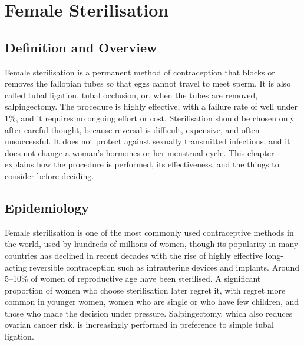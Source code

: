 \chapter{Female Sterilisation}

\section*{Definition and Overview}
Female sterilisation is a permanent method of contraception that blocks or removes the fallopian tubes so that eggs cannot travel to meet sperm. It is also called tubal ligation, tubal occlusion, or, when the tubes are removed, salpingectomy. The procedure is highly effective, with a failure rate of well under 1\%, and it requires no ongoing effort or cost. Sterilisation should be chosen only after careful thought, because reversal is difficult, expensive, and often unsuccessful. It does not protect against sexually transmitted infections, and it does not change a woman's hormones or her menstrual cycle. This chapter explains how the procedure is performed, its effectiveness, and the things to consider before deciding.

\section*{Epidemiology}
Female sterilisation is one of the most commonly used contraceptive methods in the world, used by hundreds of millions of women, though its popularity in many countries has declined in recent decades with the rise of highly effective long-acting reversible contraception such as intrauterine devices and implants. Around 5--10\% of women of reproductive age have been sterilised. A significant proportion of women who choose sterilisation later regret it, with regret more common in younger women, women who are single or who have few children, and those who made the decision under pressure. Salpingectomy, which also reduces ovarian cancer risk, is increasingly performed in preference to simple tubal ligation.

